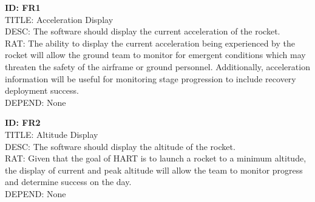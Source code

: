 \documentclass[onecolumn, draftclsnofoot,10pt, compsoc]{IEEEtran}
\begin{document}
     	\noindent
			\textbf{ID: FR1}\\
			TITLE: Acceleration Display\\
			DESC: The software should display the current acceleration of the rocket.\\
			RAT: The ability to display the current acceleration being experienced by the rocket will allow the ground team to monitor for emergent conditions which may threaten the safety of the airframe or ground personnel.
				Additionally, acceleration information will be useful for monitoring stage progression to include recovery deployment success.\\
			DEPEND: None
			
			\noindent
			\textbf{ID: FR2}\\
			TITLE: Altitude Display\\
			DESC: The software should display the altitude of the rocket.\\
			RAT: Given that the goal of HART is to launch a rocket to a minimum altitude, the display of current and peak altitude will allow the team to monitor progress and determine success on the day.\\
			DEPEND: None\
			
			
			
      
\end{document}
